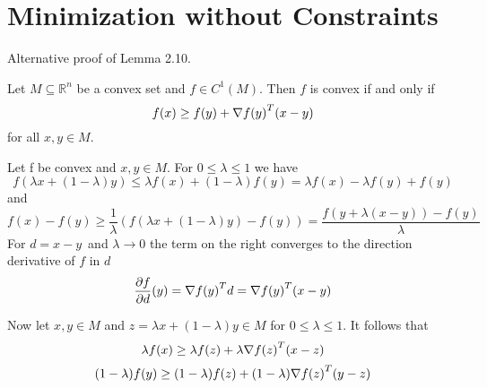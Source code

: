 
\newpage
\section{Minimization without Constraints}

Alternative proof of Lemma 2.10.

\lemma{}
Let \(M \subseteq \mathbb{R}^n\) be a convex set and \(f \in C^1(M)\). Then \(f\) is convex if and only if
\begin{equation}
    f(x) \ge f(y) + \nabla {f(y)}^T (x - y)
\end{equation}
for all \(x, y \in M \). 

\proof{}
Let f be convex and \(x, y \in M\). For \( 0 \le \lambda \le 1 \) we have
\[ 
    f(\lambda x + (1 - \lambda) y) \le \lambda f(x) + (1 - \lambda)f(y) =  \lambda f(x) - \lambda f(y) + f(y) 
\] 
and 
\[ 
    f(x) - f(y) \ge \frac{1}{\lambda} (f(\lambda x + (1 - \lambda) y) - f(y)) 
        = \frac{f(y + \lambda (x - y)) - f(y)}{\lambda}
\]
For \( d = x - y \)\ and \( \lambda \to 0 \) the term on the right converges to the direction derivative of \( f \)
in \( d \)
\[
    \frac{\partial f}{\partial d}(y) = \nabla{f(y)}^T d = \nabla{f(y)}^T (x - y) 
\]

Now let \( x, y \in M \) and \( z = \lambda x + (1 - \lambda) y \in M \) for \( 0 \le \lambda \le 1 \). It follows that
\[
    \lambda f(x) \ge \lambda f(z) + \lambda \nabla {f(z)}^T (x - z)
\]
\[
    (1 - \lambda) f(y) \ge (1 - \lambda) f(z) + (1 - \lambda) \nabla {f(z)}^T (y - z)
\]

